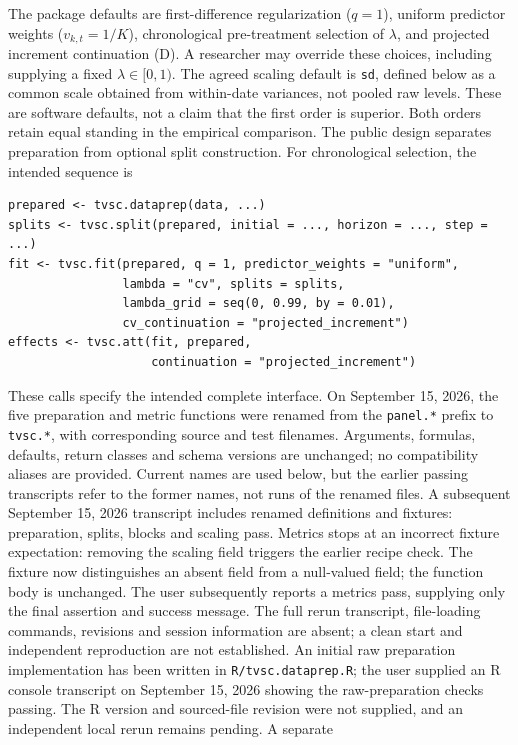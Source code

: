 \documentclass[11pt]{article}
\begin{document}
The package defaults are first-difference regularization ($q=1$), uniform
predictor weights ($v_{k,t}=1/K$), chronological pre-treatment selection
of $\lambda$, and projected increment continuation (D). A researcher may
override these choices, including supplying a fixed $\lambda\in[0,1)$.
The agreed scaling default is \texttt{sd}, defined below as a common
scale obtained from within-date variances, not pooled raw levels.
These are software defaults, not a claim that the first order is superior.
Both orders retain equal standing in the empirical comparison.
The public design separates preparation from optional split construction.
For chronological selection, the intended sequence is
\begin{verbatim}
prepared <- tvsc.dataprep(data, ...)
splits <- tvsc.split(prepared, initial = ..., horizon = ..., step = ...)
fit <- tvsc.fit(prepared, q = 1, predictor_weights = "uniform",
                lambda = "cv", splits = splits,
                lambda_grid = seq(0, 0.99, by = 0.01),
                cv_continuation = "projected_increment")
effects <- tvsc.att(fit, prepared,
                    continuation = "projected_increment")
\end{verbatim}
These calls specify the intended complete interface. On September 15,
2026, the five preparation and metric functions were renamed from the
\texttt{panel.*} prefix to \texttt{tvsc.*}, with corresponding source and
test filenames. Arguments, formulas, defaults, return classes and schema
versions are unchanged; no compatibility aliases are provided. Current
names are used below, but the earlier passing transcripts refer to the
former names, not runs of the renamed files. A subsequent September 15,
2026 transcript includes renamed definitions and fixtures: preparation,
splits, blocks and scaling pass. Metrics stops at an incorrect fixture
expectation: removing the scaling field triggers the earlier recipe
check. The fixture now distinguishes an absent field from a null-valued
field; the function body is unchanged. The user subsequently reports a
metrics pass, supplying only the final assertion and success message.
The full rerun transcript, file-loading commands, revisions and session information are
absent; a clean start and independent reproduction are not established.
An initial
raw preparation implementation has been written in \texttt{R/tvsc.dataprep.R};
the user supplied an R console transcript on September 15, 2026 showing the
raw-preparation checks passing. The R version and sourced-file revision were
not supplied, and an independent local rerun remains pending. A separate
\end{document}
